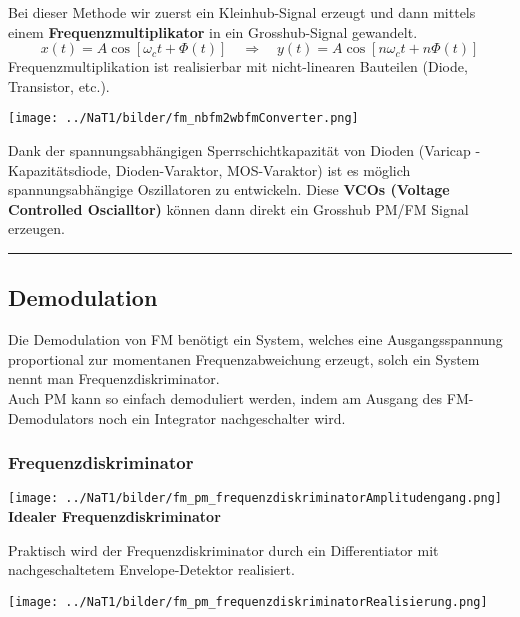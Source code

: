 \begin{minipage}[t][3cm][c]{10cm}	
	Bei dieser Methode wir zuerst ein Kleinhub-Signal erzeugt und dann mittels einem
	\textbf{Frequenzmultiplikator} in ein Grosshub-Signal gewandelt.
	$$ x(t) = A \cos[\omega_c t + \Phi(t)] \quad \Rightarrow \quad y(t) = A \cos[n \omega _c t + n
	\Phi(t)]$$ Frequenzmultiplikation ist realisierbar mit nicht-linearen Bauteilen (Diode, Transistor,
	etc.).
\end{minipage}
\begin{minipage}[t][3cm][c]{8.5cm} 
	\begin{center}
		\texttt{[image: ../NaT1/bilder/fm\_nbfm2wbfmConverter.png]}
	\end{center}
\end{minipage}

Dank der spannungsabhängigen Sperrschichtkapazität von Dioden (Varicap - Kapazitätsdiode,
Dioden-Varaktor, MOS-Varaktor) ist es möglich spannungsabhängige Oszillatoren zu entwickeln. Diese \textbf{VCOs
(Voltage Controlled Oscialltor)} können dann direkt ein Grosshub PM/FM Signal
erzeugen.\\

\hrule
\subsection{Demodulation}
Die Demodulation von FM benötigt ein System, welches eine Ausgangsspannung proportional zur
momentanen Frequenzabweichung erzeugt, solch ein System nennt man Frequenzdiskriminator. \\
Auch PM kann so einfach demoduliert werden, indem am Ausgang des FM-Demodulators noch ein
Integrator nachgeschalter wird.

\subsubsection{Frequenzdiskriminator}
\begin{minipage}[t][3cm][c]{6cm}	
	\begin{center}
  		\texttt{[image: ../NaT1/bilder/fm\_pm\_frequenzdiskriminatorAmplitudengang.png]} \\
  		\textbf{Idealer Frequenzdiskriminator}
	\end{center}
\end{minipage}
\begin{minipage}[t][3cm][c]{6cm} 
	Praktisch wird der Frequenzdiskriminator durch ein Differentiator mit nachgeschaltetem
	Envelope-Detektor realisiert.
\end{minipage}
\begin{minipage}[t][3cm][c]{6cm} 
	\begin{center}
		\texttt{[image: ../NaT1/bilder/fm\_pm\_frequenzdiskriminatorRealisierung.png]} \\ 
	\end{center}
\end{minipage}


